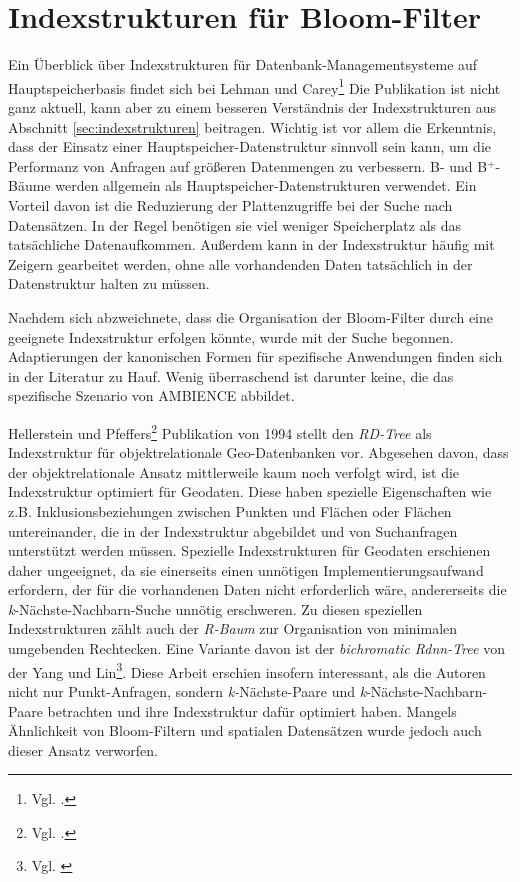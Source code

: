 \section{Indexstrukturen für Bloom-Filter}\label{sec:bloom-index}
Ein Überblick über Indexstrukturen für Datenbank-Managementsysteme auf Hauptspei\-cher\-basis findet sich bei Lehman und Carey\footnote{Vgl. \cite{Lehman1986}.} Die Publikation ist nicht ganz aktuell, kann aber zu einem besseren Verständnis der Indexstrukturen aus Abschnitt \ref{sec:indexstrukturen} beitragen. Wichtig ist vor allem die Erkenntnis, dass der Einsatz einer Hauptspeicher-Datenstruktur sinnvoll sein kann, um die Performanz von Anfragen auf größeren Datenmengen zu verbessern. B- und B$^+$-Bäume werden allgemein als Hauptspeicher-Datenstruk\-turen verwendet. Ein Vorteil davon ist die Reduzierung der Plattenzugriffe bei der Suche nach Datensätzen. In der Regel benötigen sie viel weniger Speicherplatz als das tatsächliche Datenaufkommen. Außerdem kann in der Indexstruktur häufig mit Zeigern gearbeitet werden, ohne alle vorhandenden Daten tatsächlich in der Datenstruktur halten zu müssen. 

Nachdem sich abzweichnete, dass die Organisation der Bloom-Filter durch eine geeignete Indexstruktur erfolgen könnte, wurde mit der Suche begonnen. Adaptierungen der kanonischen Formen für spezifische Anwendungen finden sich in der Literatur zu Hauf. Wenig überraschend ist darunter keine, die das spezifische Szenario von AMBIENCE abbildet.

Hellerstein und Pfeffers\footnote{Vgl. \cite{Hellerstein1994}.} Publikation von 1994 stellt den \textit{RD-Tree} als Indexstruktur für objektrelationale Geo-Datenbanken vor. Abgesehen davon, dass der objektrelationale Ansatz mittlerweile kaum noch verfolgt wird, ist die Indexstruktur optimiert für Geodaten. Diese haben spezielle Eigenschaften wie z.B. Inklusionsbeziehungen zwischen Punkten und Flächen oder Flächen untereinander, die in der Indexstruktur abgebildet und von Suchanfragen unterstützt werden müssen. Spezielle Indexstrukturen für Geodaten erschienen daher ungeeignet, da sie einerseits einen unnötigen Implementierungsaufwand erfordern, der für die vorhandenen Daten nicht erforderlich wäre, andererseits die \textit{k}-Nächste-Nachbarn-Suche unnötig erschweren. Zu diesen speziellen Indexstrukturen zählt auch der \textit{R-Baum} zur Organisation von minimalen umgebenden Rechtecken. Eine Variante davon ist der \textit{bichromatic Rdnn-Tree} von der Yang und Lin\footnote{Vgl. \cite{Yang2002}}. Diese Arbeit erschien insofern interessant, als die Autoren nicht nur Punkt-Anfragen, sondern \textit{k-}Nächste-Paare und \textit{k}-Nächste-Nachbarn-Paare betrachten und ihre Indexstruktur dafür optimiert haben. Mangels Ähnlichkeit von Bloom-Filtern und spatialen Datensätzen wurde jedoch auch dieser Ansatz verworfen. 

